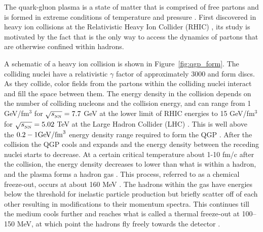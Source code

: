 
The quark-gluon plasma is a state of matter that is comprised of free partons and is formed in extreme conditions of temperature and pressure \cite{SHURYAK198071}.
First discovered in heavy ion collisions at the Relativistic Heavy Ion Collider (RHIC) \cite{ARSENE20051, Adcox:2004mh, ADAMS2005102, Back:2004je}, its study is motivated by the fact that is the only way to access the dynamics of partons that are otherwise confined within hadrons.


A schematic of a heavy ion collision is shown in Figure~\ref{fig:qgp_form}.
The colliding nuclei have a relativistic $\gamma$ factor of approximately 3000 and form discs.
As they collide, color fields from the partons within the colliding nuclei interact and fill the space between them.
The energy density in the collision depends on the number of colliding nucleons and the collision energy, and can range from 1 GeV/fm$^3$ for $\mbox{$\sqrt{s_{_\text{NN}}}$} = 7.7$ GeV at the lower limit of RHIC energies \cite{PhysRevC.93.024901} to 15 GeV/fm$^3$ for $\mbox{$\sqrt{s_{_\text{NN}}}$} = 5.02$ TeV at the Large Hadron Collider (LHC) \cite{PhysRevC.94.034903, PhysRevLett.109.152303, Jiang:2018wzu}.
This is well above the $0.2 - 1 \rm{GeV}/\rm{fm}^3$ energy density range required to form the QGP \cite{Karsch2002, PhysRevD.90.094503}.
After the collision the QGP cools and expands and the energy density between the receding nuclei starts to decrease.
At a certain critical temperature about 1-10 fm/c after the collision, the energy density decreases to lower than what is within a hadron, and the plasma forms a hadron gas \cite{doi:10.1146/annurev.nucl.46.1.71}.
This process, referred to as a chemical freeze-out, occurs at about 160 MeV \cite{Fodor_2004, ADAMS2005102, PhysRevC.93.024917, Borsanyi:2010bp}.
The hadrons within the gas have energies below the threshold for inelastic particle production but briefly scatter off of each other resulting in modifications to their momentum spectra.
This continues till the medium cools further and reaches what is called a thermal freeze-out at 100--150 MeV, at which point the hadrons fly freely towards the detector \cite{PhysRevC.69.024904, PhysRevC.72.014908, PhysRevC.75.024910, PhysRevC.88.044910}.

